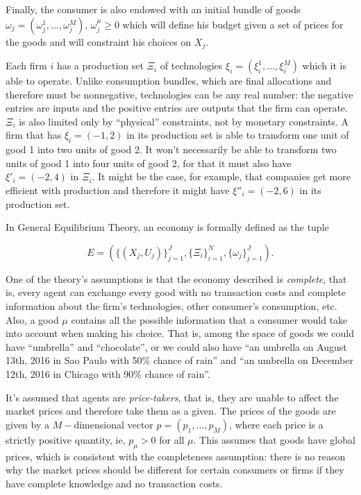Finally, the consumer is also endowed with an initial bundle of goods
$\omega_j = (\omega_j^1, \ldots, \omega_j^M)$, $\omega_j^\mu \geq 0$
which will define his budget given a set of prices for the goods and
will constraint his choices on $X_j$.

Each firm $i$ has a production set $\Xi_i$ of technologies
$\xi_i = (\xi_i^1, \ldots, \xi_i^M)$ which it is able to operate. Unlike
consumption bundles, which are final allocations and therefore must be
nonnegative, technologies can be any real number: the negative entries
are inputs and the positive entries are outputs that the firm can
operate. $\Xi_i$ is also limited only by ``physical'' constraints, not
by monetary constraints. A firm that has $\xi_i = (-1, 2)$ in its
production set is able to transform one unit of good 1 into two units
of good 2. It won't necessarily be able to transform two units of good
1 into four units of good 2, for that it must also have $\xi'_i = (-2,
4)$ in $\Xi_i$. It might be the case, for example, that companies get more efficient
with production and therefore it might have $\xi''_i = (-2, 6)$ in its
production set.

In General Equilibrium Theory, an economy is formally defined as the tuple

\begin{equation}
  E = \left(\{(X_j,U_j)\}_{j=1}^J,
    \{\Xi_i\}_{i=1}^N, \{\omega_j\}_{j=1}^J \right).\label{eq:econGE}
\end{equation}

One of the theory's assumptions is that the economy described is
\emph{complete}, that is, every agent can exchange every good with no
transaction costs and complete information about the firm's
technologies, other consumer's consumption, etc. Also, a good $\mu$
contains all the possible information that a consumer would take into
account when making his choice. That is, among the space of goods we
could have ``umbrella'' and ``chocolate'', or we could also have ``an
umbrella on August 13th, 2016 in Sao Paulo with 50\% chance of rain''
and ``an umbrella on December 12th, 2016 in Chicago with 90\% chance
of rain''. 

It's assumed that agents are \emph{price-takers}, that is, they are
unable to affect the market prices and therefore take them as a
given. The prices of the goods are given by a $M-$dimensional vector
$p = (p_1, \ldots, p_M)$, where each price is a strictly positive
quantity, ie, $p_\mu>0$ for all $\mu$. This assumes that goods have global
prices, which is consistent with the completeness assumption: there is
no reason why the market prices should be different for certain
consumers or firms if they have complete knowledge and no transaction
costs.

